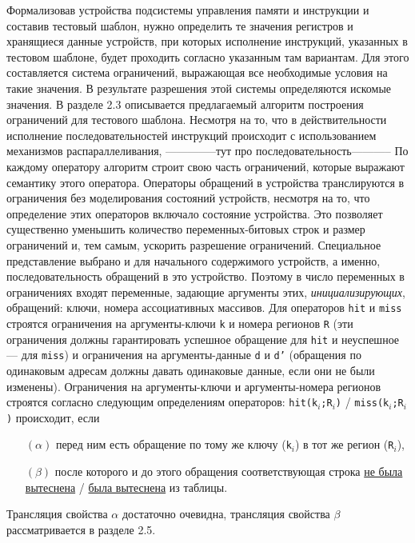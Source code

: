\documentclass[14pt,autoref,href
,facsimile
]{disser}
\begin{document}
Формализовав устройства подсистемы управления памяти и инструкции и составив тестовый шаблон, нужно определить те значения регистров и хранящиеся данные устройств, при которых исполнение инструкций, указанных в тестовом шаблоне, будет проходить согласно указанным там вариантам. Для этого составляется система ограничений, выражающая все необходимые условия на такие значения. В результате разрешения этой системы определяются искомые значения. В разделе 2.3 описывается предлагаемый алгоритм построения ограничений для тестового шаблона. Несмотря на то, что в действительности исполнение последовательностей инструкций происходит с использованием механизмов распараллеливания,  --------------тут про последовательность-----------     По каждому оператору алгоритм строит свою часть ограничений, которые выражают семантику этого оператора. Операторы обращений в устройства транслируются в ограничения без моделирования состояний устройств, несмотря на то, что определение этих операторов включало состояние устройства. Это позволяет существенно уменьшить количество переменных-битовых строк и размер ограничений и, тем самым, ускорить разрешение ограничений. Специальное представление выбрано и для начального содержимого устройств, а именно, последовательность обращений в это устройство. Поэтому в число переменных в ограничениях входят переменные, задающие аргументы этих, \emph{инициализирующих}, обращений: ключи, номера ассоциативных массивов. Для операторов \texttt{hit} и \texttt{miss} строятся ограничения на аргументы-ключи \texttt{k} и номера регионов \texttt{R} (эти ограничения должны гарантировать успешное обращение для \texttt{hit} и неуспешное --- для \texttt{miss}) и ограничения на аргументы-данные \texttt{d} и \texttt{d'} (обращения по одинаковым адресам должны давать одинаковые данные, если они не были изменены). Ограничения на аргументы-ключи и аргументы-номера регионов строятся согласно следующим определениям операторов: \texttt{hit(k$_i$;R$_i$)} / \texttt{miss(k$_i$;R$_i$)} происходит, если
\begin{itemize}
\item[$(\alpha)$] перед ним есть обращение по тому же ключу (\texttt{k}$_i$) в тот же регион (\texttt{R}$_i$),
\item[$(\beta)$] после которого и до этого обращения соответствующая строка \underline{не была} \underline{вытеснена} / \underline{была вытеснена} из таблицы.
\end{itemize}

Трансляция свойства $\alpha$ достаточно очевидна, трансляция свойства $\beta$ рассматривается в разделе 2.5.
\end{document}

